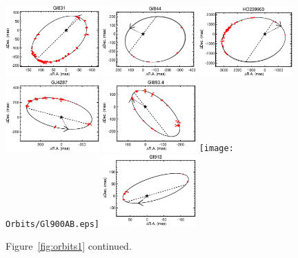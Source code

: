 \documentclass[twocolumn]{aastex62}
\begin{document}
\begin{figure}[htp]
\begin{center}
\includegraphics[width=0.32\textwidth]{Orbits/Gl831AB.eps}
\includegraphics[width=0.32\textwidth]{Orbits/Gl844AB.eps}
\includegraphics[width=0.32\textwidth]{Orbits/HD239960AB.eps} 
\includegraphics[width=0.32\textwidth]{Orbits/GJ4287AB.eps}
\includegraphics[width=0.32\textwidth]{Orbits/Gl8934AB.eps}
\texttt{[image: Orbits/Gl900AB.eps]}
\includegraphics[width=0.32\textwidth]{Orbits/Gl913AB.eps}
\caption{Figure~\ref{fig:orbits1} continued.}
\label{fig:orbits5}
\end{center}
\end{figure}

\clearpage

\end{document}
